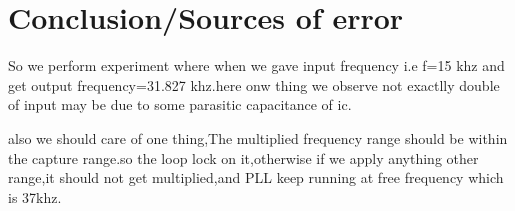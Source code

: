 \documentclass{article}
\begin{document}
\section{Conclusion/Sources of error}
 So we perform experiment where when we gave input frequency i.e f=15 khz and get output frequency=31.827 khz.here onw thing we observe not exactlly double of input may be due to some parasitic capacitance of ic.\par 
 also we should care of one thing,The multiplied frequency range should be within the capture range.so the loop lock on it,otherwise if we apply anything other range,it should not get multiplied,and PLL keep running at free frequency which is 37khz.
 
 
 
\end{document}
